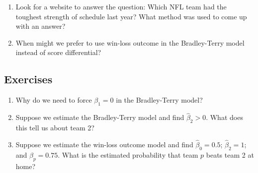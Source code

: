 \documentclass{article}
\begin{document}
  \begin{enumerate}
    \item Look for a website to answer the question: Which NFL team had the toughest strength of schedule last year? What method was used to come up with an answer?
    \item When might we prefer to use win-loss outcome in the Bradley-Terry model instead of score differential?
  \end{enumerate}

  \subsection{\sc Exercises}

  \begin{enumerate}
    \item Why do we need to force $\beta_1 = 0$ in the Bradley-Terry model?
    \item Suppose we estimate the Bradley-Terry model and find $\hat\beta_2 > 0$. What does this tell us about team 2?
    \item Suppose we estimate the win-loss outcome model and find $\hat\beta_0 = 0.5$; $\hat\beta_2 = 1$; and $\hat\beta_p = 0.75$. What is the estimated probability that team $p$ beats team 2 at home?
  \end{enumerate}
\end{document}
